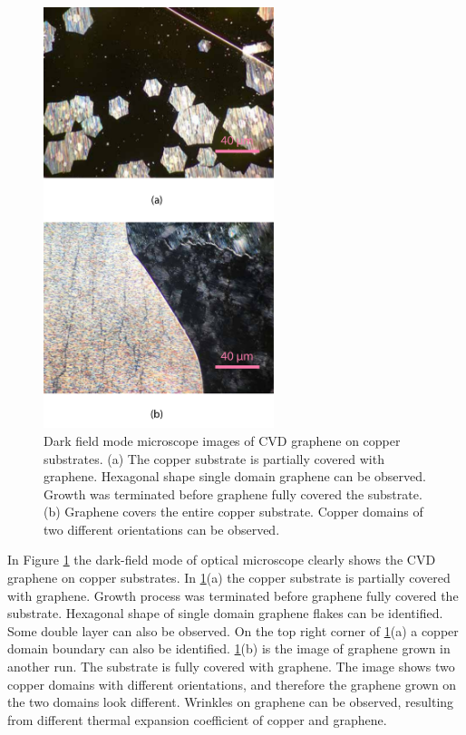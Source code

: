\documentclass[pdflatex, sectionletters, 12pt]{pittetd}    %
\begin{document}
\begin{figure}[p]
	\centering
	\includegraphics[width=0.6\textwidth]{Drawing/CVDGraphene.pdf}
	\caption{Dark field mode microscope images of CVD graphene on copper substrates. (a) The copper substrate is partially covered with graphene. Hexagonal shape single domain graphene can be observed. Growth was terminated before graphene fully covered the substrate. (b) Graphene covers the entire copper substrate. Copper domains of two different orientations can be observed. }
	\label{FIG:CVDGraphene}
\end{figure}

In Figure \ref{FIG:CVDGraphene} the dark-field mode of optical microscope clearly shows the CVD graphene on copper substrates. In \ref{FIG:CVDGraphene}(a) the copper substrate is partially covered with graphene. Growth process was terminated before graphene fully covered the substrate. Hexagonal shape of single domain graphene flakes can be identified. Some double layer can also be observed. On the top right corner of \ref{FIG:CVDGraphene}(a) a copper domain boundary can also be identified. \ref{FIG:CVDGraphene}(b) is the image of graphene grown in another run. The substrate is fully covered with graphene. The image shows two copper domains with different orientations, and therefore the graphene grown on the two domains look different. Wrinkles on graphene can be observed, resulting from different thermal expansion coefficient of copper and graphene. 
\end{document}
